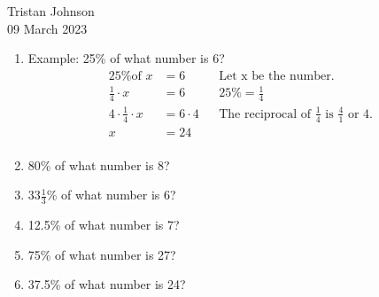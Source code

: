 \documentclass[14pt]{extarticle} %
\begin{document}
\hfill Tristan Johnson\\
\null\hfill 09 March 2023

\vspace{10mm}

\begin{enumerate}[label=\Alph*.), itemsep=\fill]
    \item Example: 25\% of what number is 6?
        \begin{align*} 
            \text{25\% of } x &= 6 && \text{Let x be the number.}\\[1em]
            \frac{1}{4} \cdot x &= 6 && 25\% = \frac{1}{4}\\[1em]
            4 \cdot \frac{1}{4} \cdot x &= 6 \cdot 4 && \text{The reciprocal of $\frac{1}{4}$ is $\frac{4}{1}$ or 4.}\\[1em]
            x &= 24\\[1em]
        \end{align*}
    \item 80\% of what number is 8?
    \item $33\frac{1}{3}$\% of what number is 6?
\vfill\clearpage
    \item 12.5\% of what number is 7?
    \item 75\% of what number is 27?
    \item 37.5\% of what number is 24?
\vfill\end{enumerate}
\end{document}
